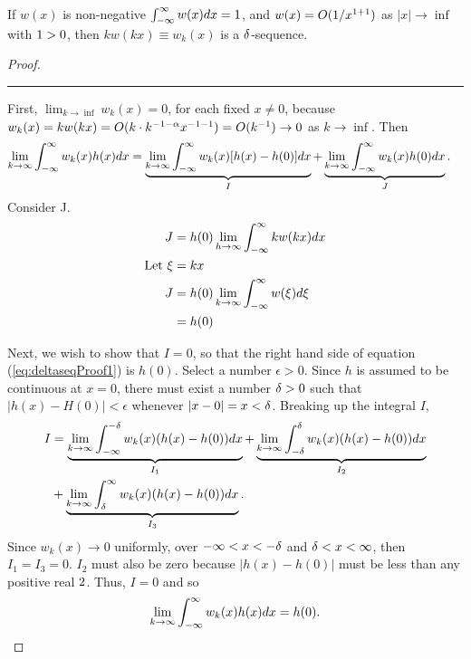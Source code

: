 \begin{theorem}\label{th:assertion}
    If \(w(x)\) is non-negative \(\int_{-\infty}^{\infty} w(x) dx = 1\), and \(w(x)=O(1/x^{1+1})\) as \(|x| \rightarrow \inf\) with \(1>0\), then \(kw(kx) \equiv w_k(x)\) is a \(\delta\)-sequence.
\end{theorem}
\begin{proof}
    \noindent\rule{0.9236\textwidth}{1pt}
    
    First, \( \lim_{k\rightarrow \inf} w_k(x)=0\), for each fixed \(x \neq 0\), because \(w_k(x)=kw(kx)=O(k\cdot k^{-1-\alpha} x^{-1-1}) = O(k^{-1}) \rightarrow 0\) as \(k \rightarrow \inf\). Then 
    \begin{equation}\label{eq:deltaseqProof1}
        \begin{split}
            \lim_{k\rightarrow \infty}\int_{-\infty}^{\infty} w_k(x)h(x) dx &= \underbrace{\lim_{k\rightarrow\infty} \int_{-\infty}^{\infty} w_k(x)[h(x)-h(0)]dx}_I+ \underbrace{\lim_{k\rightarrow\infty} \int_{-\infty}^{\infty} w_k(x)h(0)dx}_J.
        \end{split}
    \end{equation}
    Consider J.
    \begin{equation}
        \begin{split}
            J &= h(0) \lim_{h\rightarrow\infty} \int_{-\infty}^{\infty} kw(kx)dx\\
            \text{Let  }\xi & =kx\\
            J&=h(0)\lim_{k\rightarrow \infty} \int_{-\infty}^{\infty} w(\xi) d\xi\\
            &= h(0)
        \end{split}
    \end{equation}

    Next, we wish to show that \(I=0\), so that the right hand side of equation (\ref{eq:deltaseqProof1}) is \(h(0)\). Select a number \(\epsilon > 0\). Since \(h\) is assumed to be continuous at \(x=0\), there must exist a number \(\delta>0\) such that \(|h(x)-H(0)|<\epsilon\) whenever \(|x-0|=x<\delta\). Breaking up the integral \(I\),
    \begin{equation}
        \begin{split}
            I &= \underbrace{\lim_{k\rightarrow \infty} \int_{-\infty}^{-\delta} w_k(x)(h(x)-h(0)) dx}_{I_1} + \underbrace{\lim_{k\rightarrow \infty} \int_{-\delta}^{\delta} w_k(x)(h(x)-h(0)) dx}_{I_2} \\ & + \underbrace{\lim_{k\rightarrow \infty} \int_{\delta}^{\infty} w_k(x)(h(x)-h(0)) dx}_{I_3}.\\
        \end{split}
    \end{equation}
    Since \(w_k(x)\rightarrow 0\) uniformly, over \(-\infty< x < -\delta\) and \(\delta < x < \infty \), then \(I_1=I_3 =0\). \(I_2\) must also be zero because \(|h(x)-h(0)|\) must be less than any positive real \(2\). Thus, \(I=0\) and so 
    \begin{equation}
        \lim_{k\rightarrow \infty}\int_{-\infty}^{\infty} w_k(x)h(x) dx = h(0).
    \end{equation}
\end{proof}

